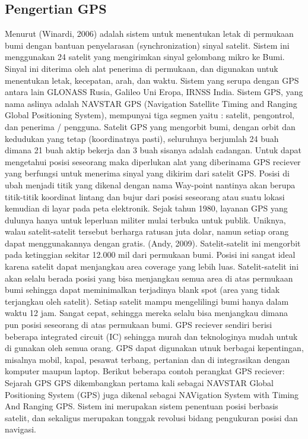 \subsection{Pengertian GPS}
Menurut (Winardi, 2006) adalah sistem untuk menentukan letak di permukaan bumi dengan bantuan penyelarasan (synchronization) sinyal satelit. Sistem ini menggunakan 24 satelit yang mengirimkan sinyal gelombang mikro ke Bumi. Sinyal ini diterima oleh alat penerima di permukaan, dan digunakan untuk menentukan letak, kecepatan, arah, dan waktu. Sistem yang serupa dengan GPS antara lain GLONASS Rusia, Galileo Uni Eropa, IRNSS India. 
Sistem GPS, yang nama aslinya adalah NAVSTAR GPS (Navigation Satellite Timing and Ranging Global Positioning System), mempunyai tiga segmen yaitu : satelit, pengontrol, dan penerima / pengguna. Satelit GPS yang mengorbit bumi, dengan orbit dan kedudukan yang tetap (koordinatnya pasti), seluruhnya berjumlah 24 buah dimana 21 buah aktip bekerja dan 3 buah sisanya adalah cadangan.
Untuk dapat mengetahui posisi seseorang maka diperlukan alat yang diberinama GPS reciever yang berfungsi untuk menerima sinyal yang dikirim dari satelit GPS. Posisi di ubah menjadi titik yang dikenal dengan nama Way-point nantinya akan berupa titik-titik koordinat lintang dan bujur dari posisi seseorang atau suatu lokasi kemudian di layar pada peta elektronik. Sejak tahun 1980, layanan GPS yang dulunya hanya untuk leperluan militer mulai terbuka untuk publik. Uniknya, walau satelit-satelit tersebut berharga ratusan juta dolar, namun setiap orang dapat menggunakannya dengan gratis. (Andy, 2009).
Satelit-satelit ini mengorbit pada ketinggian sekitar 12.000 mil dari permukaan bumi. Posisi ini sangat ideal karena satelit dapat menjangkau area coverage yang lebih luas. Satelit-satelit ini akan selalu berada posisi yang bisa menjangkau semua area di atas permukaan bumi sehingga dapat meminimalkan terjadinya blank spot (area yang tidak terjangkau oleh satelit). Setiap satelit mampu mengelilingi bumi hanya dalam waktu 12 jam. Sangat cepat, sehingga mereka selalu bisa menjangkau dimana pun posisi seseorang di atas permukaan bumi.
GPS reciever sendiri berisi beberapa integrated circuit (IC) sehingga murah dan teknologinya mudah untuk di gunakan oleh semua orang. GPS dapat digunakan utnuk berbagai kepentingan, misalnya mobil, kapal, pesawat terbang, pertanian dan di integrasikan dengan komputer maupun laptop. Berikut beberapa contoh perangkat GPS reciever:
Sejarah GPS
GPS dikembangkan pertama kali sebagai NAVSTAR Global Positioning System (GPS) juga dikenal sebagai NAVigation System with Timing And Ranging GPS. Sistem ini merupakan sistem penentuan posisi berbasis satelit, dan sekaligus merupakan tonggak revolusi bidang pengukuran posisi dan navigasi. 
